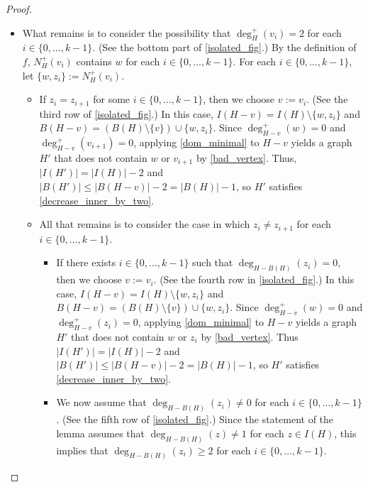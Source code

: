 \documentclass{patmorin}
\begin{document}
\begin{proof}
\begin{itemize}[leftmargin=*,label=$\bigstar$]
\begin{itemize}[leftmargin=*,label=]
\item Therefore, we may assume that $\deg^+_H(v_{i-1})=\deg^+_H(v_{i+1})=1$. (See the second row of \cref{isolated_fig}.) Let $v:=v_i$. Then $I(H-v)=I(H)\setminus \{w\}$ and $B(H-v)=(B(H)\setminus \{v\})\cup\{w\}$.  Let $H'$ be obtained by applying \cref{dom_minimal} to $H-v$.  Since $w\in B(H-v)$ and $\deg^+_{H-v}(w)=0$, \ref{bad_vertex} implies that $w\not\in V(H')$, so $w\not\in B(H')$.  Since $N^+_H(v_{i-1})=N^+_H(v_{i+1})=\{w\}$ and $w\in B(H-v)$, $\deg^+_{H-v}(v_{i-1})=\deg^+_{H-v}(v_{i+1})=0$, so \ref{bad_vertex} implies that $v_{i-1},v_{i+1}\not\in V(H')$, so $v_{i-1},v_{i+1}\not\in B(H')$.  Therefore, $|B(H')|\le |B(H-v)|-3= |B(H)|-3$.  By \ref{same_inner_vertices}, $|I(H')|=|I(H-v)|=|I(H)|-1$.  Thus $H'$ satisfies \ref{decrease_boundary_by_three}.
\end{itemize}
\item What remains is to consider the possibility that $\deg^+_H(v_i)=2$ for each $i\in\{0,\ldots,k-1\}$. (See the bottom part of \cref{isolated_fig}.)  By the definition of $f$, $N^+_H(v_i)$ contains $w$ for each $i\in\{0,\ldots,k-1\}$.  For each $i\in\{0,\ldots,k-1\}$, let $\{w,z_i\}:=N^+_H(v_i)$.  
\begin{itemize}[leftmargin=*,label=]
\item If $z_i=z_{i+1}$ for some $i\in\{0,\ldots,k-1\}$, then we choose $v:=v_i$. (See the third row of \cref{isolated_fig}.)  In this case, $I(H-v)=I(H)\setminus\{w,z_i\}$ and $B(H-v)=(B(H)\setminus \{v\})\cup \{w,z_i\}$. Since $\deg^+_{H-v}(w)=0$ and $\deg^+_{H-v}(v_{i+1})=0$, applying \cref{dom_minimal} to $H-v$ yields a graph $H'$ that does not contain $w$ or $v_{i+1}$ by \ref{bad_vertex}.  Thus, $|I(H')|=|I(H)|-2$ and $|B(H')|\le |B(H-v)|-2 = |B(H)|-1$, so $H'$ satisfies \ref{decrease_inner_by_two}.  
\item All that remains is to consider the case in which $z_i\neq z_{i+1}$ for each $i\in\{0,\ldots,k-1\}$.  
\begin{itemize}[leftmargin=*,label=]
\item If there exists $i\in\{0,\ldots,k-1\}$ such that $\deg_{H-B(H)}(z_i)=0$, then we choose $v:=v_i$. (See the fourth row in \cref{isolated_fig}.)  In this case, $I(H-v)=I(H)\setminus\{w,z_i\}$ and $B(H-v)=(B(H)\setminus\{v\})\cup\{w,z_i\}$.  Since $\deg^+_{H-v}(w)=0$ and $\deg^+_{H-v}(z_i)=0$, applying \cref{dom_minimal} to $H-v$ yields a graph $H'$ that does not contain $w$ or $z_i$ by \ref{bad_vertex}.  Thus $|I(H')|=|I(H)|-2$ and $|B(H')|\le |B(H-v)|-2 = |B(H)|-1$, so $H'$ satisfies \ref{decrease_inner_by_two}.  
\item We now assume that $\deg_{H-B(H)}(z_i)\neq 0$ for each $i\in\{0,\ldots,k-1\}$. (See the fifth row of \cref{isolated_fig}.) Since the statement of the lemma assumes that $\deg_{H-B(H)}(z)\neq 1$ for each $z\in I(H)$, this implies that $\deg_{H-B(H)}(z_i)\ge 2$ for each $i\in\{0,\ldots,k-1\}$.


\end{itemize}
\end{itemize}
\end{itemize}
\end{proof}
\end{document}
